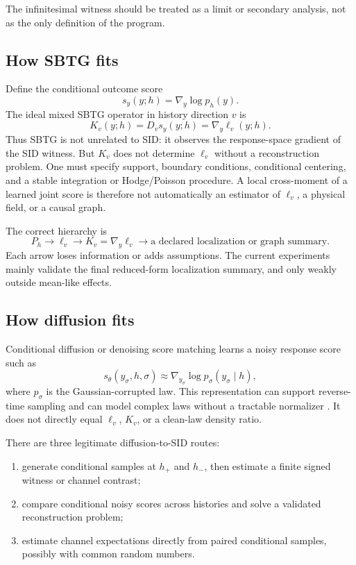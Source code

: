 \documentclass[10pt]{article}
\begin{document}
The infinitesimal witness should be treated as a limit or secondary analysis, not as the only definition of the program.

\subsection{How SBTG fits}

Define the conditional outcome score
\[
  s_y(y;h)=\nabla_y\log p_h(y).
\]
The ideal mixed SBTG operator in history direction \(v\) is
\begin{equation}
  K_v(y;h)=D_v s_y(y;h)=\nabla_y\ell_v(y;h).
  \label{eq:sbtg}
\end{equation}
Thus SBTG is not unrelated to SID: it observes the response-space gradient of the SID witness. But \(K_v\) does not determine \(\ell_v\) without a reconstruction problem. One must specify support, boundary conditions, conditional centering, and a stable integration or Hodge/Poisson procedure. A local cross-moment of a learned joint score is therefore not automatically an estimator of \(\ell_v\), a physical field, or a causal graph.

The correct hierarchy is
\[
  P_h \longrightarrow \ell_v
  \longrightarrow K_v=\nabla_y\ell_v
  \longrightarrow \text{a declared localization or graph summary}.
\]
Each arrow loses information or adds assumptions. The current experiments mainly validate the final reduced-form localization summary, and only weakly outside mean-like effects.

\subsection{How diffusion fits}

Conditional diffusion or denoising score matching learns a noisy response score such as
\[
  s_\theta(y_\sigma,h,\sigma)
  \approx \nabla_{y_\sigma}\log p_\sigma(y_\sigma\mid h),
\]
where \(p_\sigma\) is the Gaussian-corrupted law. This representation can support reverse-time sampling and can model complex laws without a tractable normalizer \cite{vincent2011,song2021}. It does not directly equal \(\ell_v\), \(K_v\), or a clean-law density ratio.

There are three legitimate diffusion-to-SID routes:

\begin{enumerate}
  \item generate conditional samples at \(h_+\) and \(h_-\), then estimate a finite signed witness or channel contrast;
  \item compare conditional noisy scores across histories and solve a validated reconstruction problem;
  \item estimate channel expectations directly from paired conditional samples, possibly with common random numbers.
\end{enumerate}
\end{document}
